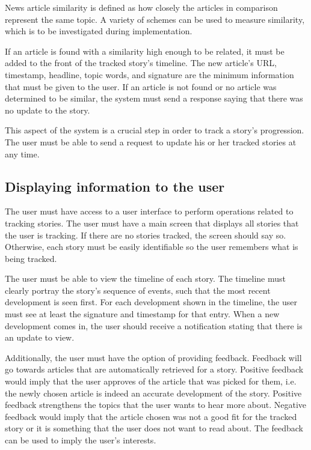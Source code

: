 \documentclass[11pt,titlepage]{report}
\begin{document}
News article similarity is defined as how closely the articles in comparison represent the same topic. A variety of schemes can be used to measure similarity, which is to be investigated during implementation.

If an article is found with a similarity high enough to be related, it must be added to the front of the tracked story's timeline. The new article's URL, timestamp, headline, topic words, and signature are the minimum information that must be given to the user. If an article is not found or no article was determined to be similar, the system must send a response saying that there was no update to the story.

This aspect of the system is a crucial step in order to track a story's progression. The user must be able to send a request to update his or her tracked stories at any time.

\subsection{Displaying information to the user}
The user must have access to a user interface to perform operations related to tracking stories. The user must have a main screen that displays all stories that the user is tracking. If there are no stories tracked, the screen should say so. Otherwise, each story must be easily identifiable so the user remembers what is being tracked. 

The user must be able to view the timeline of each story. The timeline must clearly portray the story's sequence of events, such that the most recent development is seen first. For each development shown in the timeline, the user must see at least the signature and timestamp for that entry. When a new development comes in, the user should receive a notification stating that there is an update to view.

Additionally, the user must have the option of providing feedback. Feedback will go towards articles that are automatically retrieved for a story. Positive feedback would imply that the user approves of the article that was picked for them, i.e. the newly chosen article is indeed an accurate development of the story. Positive feedback strengthens the topics that the user wants to hear more about. Negative feedback would imply that the article chosen was not a good fit for the tracked story or it is something that the user does not want to read about. The feedback can be used to imply the user's interests. 
\end{document}

